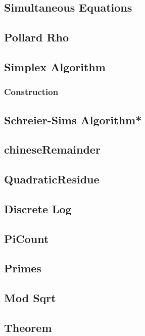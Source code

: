 \subsection{Simultaneous Equations}

\subsection{Pollard Rho}

\subsection{Simplex Algorithm}

\subsubsection{Construction}

\subsection{Schreier-Sims Algorithm*} %

\subsection{chineseRemainder}

\subsection{QuadraticResidue}

\subsection{Discrete Log}

\subsection{PiCount}

\subsection{Primes}

\subsection{Mod Sqrt}

\subsection{Theorem}

